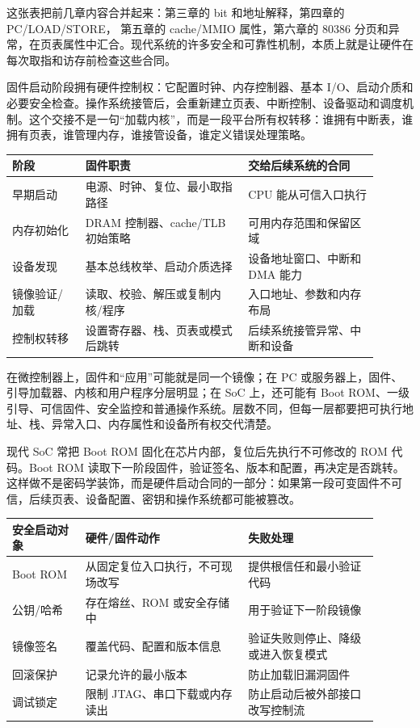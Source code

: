 这张表把前几章内容合并起来：第三章的 bit 和地址解释，第四章的 PC/LOAD/STORE， 第五章的 cache/MMIO 属性，第六章的 80386 分页和异常，在页表属性中汇合。现代系统的许多安全和可靠性机制，本质上就是让硬件在每次取指和访存前检查这些合同。

固件启动阶段拥有硬件控制权：它配置时钟、内存控制器、基本 I/O、启动介质和必要安全检查。操作系统接管后，会重新建立页表、中断控制、设备驱动和调度机制。这个交接不是一句“加载内核”，而是一段平台所有权转移：谁拥有中断表，谁拥有页表，谁管理内存，谁接管设备，谁定义错误处理策略。

\begin{longtable}{L{0.18\linewidth}L{0.4\linewidth}L{0.32\linewidth}}
\toprule
阶段 & 固件职责 & 交给后续系统的合同 \\
\midrule
早期启动 & 电源、时钟、复位、最小取指路径 & CPU 能从可信入口执行 \\
内存初始化 & DRAM 控制器、cache/TLB 初始策略 & 可用内存范围和保留区域 \\
设备发现 & 基本总线枚举、启动介质选择 & 设备地址窗口、中断和 DMA 能力 \\
镜像验证/加载 & 读取、校验、解压或复制内核/程序 & 入口地址、参数和内存布局 \\
控制权转移 & 设置寄存器、栈、页表或模式后跳转 & 后续系统接管异常、中断和设备 \\
\bottomrule
\end{longtable}

在微控制器上，固件和“应用”可能就是同一个镜像；在 PC 或服务器上，固件、引导加载器、内核和用户程序分层明显；在 SoC 上，还可能有 Boot ROM、一级引导、可信固件、安全监控和普通操作系统。层数不同，但每一层都要把可执行地址、栈、异常入口、内存属性和设备所有权交代清楚。

现代 SoC 常把 Boot ROM 固化在芯片内部，复位后先执行不可修改的 ROM 代码。Boot ROM 读取下一阶段固件，验证签名、版本和配置，再决定是否跳转。这样做不是密码学装饰，而是硬件启动合同的一部分：如果第一段可变固件不可信，后续页表、设备配置、密钥和操作系统都可能被篡改。

\begin{longtable}{L{0.18\linewidth}L{0.4\linewidth}L{0.32\linewidth}}
\toprule
安全启动对象 & 硬件/固件动作 & 失败处理 \\
\midrule
Boot ROM & 从固定复位入口执行，不可现场改写 & 提供根信任和最小验证代码 \\
公钥/哈希 & 存在熔丝、ROM 或安全存储中 & 用于验证下一阶段镜像 \\
镜像签名 & 覆盖代码、配置和版本信息 & 验证失败则停止、降级或进入恢复模式 \\
回滚保护 & 记录允许的最小版本 & 防止加载旧漏洞固件 \\
调试锁定 & 限制 JTAG、串口下载或内存读出 & 防止启动后被外部接口改写控制流 \\
\bottomrule
\end{longtable}


